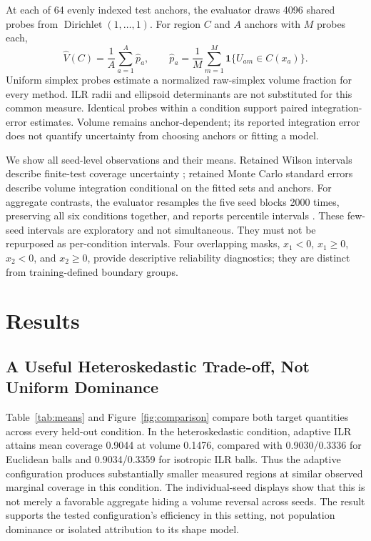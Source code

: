 \documentclass{article}
\begin{document}
At each of 64 evenly indexed test anchors, the evaluator draws 4096 shared probes from $\operatorname{Dirichlet}(1,\ldots,1)$. For region $C$ and $A$ anchors with $M$ probes each,
\begin{equation}
 \widehat V(C)=\frac1A\sum_{a=1}^A\widehat p_a,
 \qquad \widehat p_a=\frac1M\sum_{m=1}^M\mathbf1\{U_{am}\in C(x_a)\}.
 \label{eq:volume}
\end{equation}
Uniform simplex probes estimate a normalized raw-simplex volume fraction for every method. ILR radii and ellipsoid determinants are not substituted for this common measure. Identical probes within a condition support paired integration-error estimates. Volume remains anchor-dependent; its reported integration error does not quantify uncertainty from choosing anchors or fitting a model.

We show all seed-level observations and their means. Retained Wilson intervals describe finite-test coverage uncertainty \citep{Brown2001}; retained Monte Carlo standard errors describe volume integration conditional on the fitted sets and anchors. For aggregate contrasts, the evaluator resamples the five seed blocks 2000 times, preserving all six conditions together, and reports percentile intervals \citep{Efron1979,Davison1997}. These few-seed intervals are exploratory and not simultaneous. They must not be repurposed as per-condition intervals. Four overlapping masks, $x_1<0$, $x_1\ge0$, $x_2<0$, and $x_2\ge0$, provide descriptive reliability diagnostics; they are distinct from training-defined boundary groups.

\section{Results}
\subsection{A Useful Heteroskedastic Trade-off, Not Uniform Dominance}
Table~\ref{tab:means} and Figure~\ref{fig:comparison} compare both target quantities across every held-out condition. In the heteroskedastic condition, adaptive ILR attains mean coverage 0.9044 at volume 0.1476, compared with 0.9030/0.3336 for Euclidean balls and 0.9034/0.3359 for isotropic ILR balls. Thus the adaptive configuration produces substantially smaller measured regions at similar observed marginal coverage in this condition. The individual-seed displays show that this is not merely a favorable aggregate hiding a volume reversal across seeds. The result supports the tested configuration's efficiency in this setting, not population dominance or isolated attribution to its shape model.
\end{document}

